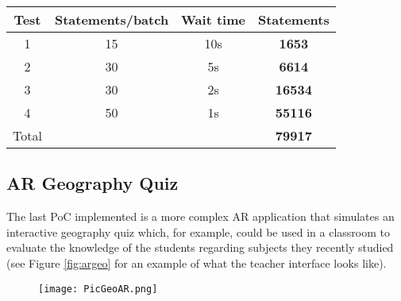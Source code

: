 \begin{table}[ht]\centering
\caption{\fontsize{10pt}{11pt}}
\begin{tabular}{cccc}
\toprule
Test & Statements/batch & Wait time & Statements \\
\midrule
1 & 15 & 10s & \textbf{1653} \\
2 & 30 & 5s & \textbf{6614} \\
3 & 30 & 2s & \textbf{16534} \\
4 & 50 & 1s & \textbf{55116} \\
\midrule
Total & & & \textbf{79917} \\
\bottomrule
\end{tabular}
\label{tab:xapistress}
\end{table}

\subsection{AR Geography Quiz}
The last PoC implemented is a more complex AR application that simulates an interactive geography quiz which, for example, could be used in a classroom to evaluate the knowledge of the students regarding subjects they recently studied (see Figure \ref{fig:argeo} for an example of what the teacher interface looks like). 

\begin{figure}[!ht]
    \begin{center}
    \texttt{[image: PicGeoAR.png]}
    \caption{\fontsize{10pt}{11pt}}
    \end{center}
\end{figure}

 
